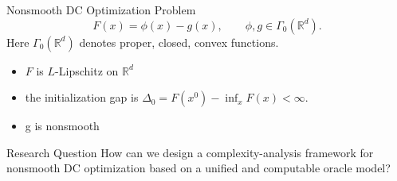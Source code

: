 \documentclass[10pt]{beamer}
\begin{document}
\begin{frame}{Nonsmooth DC Optimization Problem}
\small
\[
    F(x)=\phi(x)-g(x),
    \qquad
    \phi,g\in\Gamma_0(\mathbb R^d).
\]
Here $\Gamma_0(\mathbb R^d)$ denotes proper, closed, convex functions.

\begin{itemize}\setlength{\itemsep}{2pt}
    \item $F$ is $L$-Lipschitz on $\mathbb R^d$
    \item the initialization gap is
    $\Delta_0=F(x^0)-\inf_xF(x)<\infty$.
    \item g is nonsmooth 
\end{itemize}


\vspace{0.08cm}
\begin{alertblock}{Research Question}
How can we
design a complexity-analysis framework for nonsmooth DC optimization based on
a unified and computable oracle model?
\end{alertblock}
\end{frame}


\end{document}
